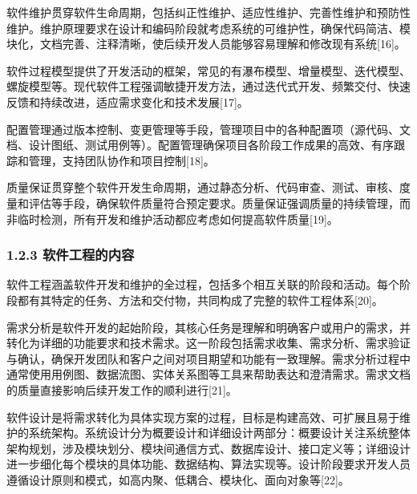 软件维护贯穿软件生命周期，包括纠正性维护、适应性维护、完善性维护和预防性维护。维护原理要求在设计和编码阶段就考虑系统的可维护性，确保代码简洁、模块化，文档完善、注释清晰，使后续开发人员能够容易理解和修改现有系统{[}16{]}。


软件过程模型提供了开发活动的框架，常见的有瀑布模型、增量模型、迭代模型、螺旋模型等。现代软件工程强调敏捷开发方法，通过迭代式开发、频繁交付、快速反馈和持续改进，适应需求变化和技术发展{[}17{]}。


配置管理通过版本控制、变更管理等手段，管理项目中的各种配置项（源代码、文档、设计图纸、测试用例等）。配置管理确保项目各阶段工作成果的高效、有序跟踪和管理，支持团队协作和项目控制{[}18{]}。


质量保证贯穿整个软件开发生命周期，通过静态分析、代码审查、测试、审核、度量和评估等手段，确保软件质量符合预定要求。质量保证强调质量的持续管理，而非临时检测，所有开发和维护活动都应考虑如何提高软件质量{[}19{]}。

\hypertarget{ux8f6fux4ef6ux5de5ux7a0bux7684ux5185ux5bb9}{%
\subsubsection{1.2.3 软件工程的内容}\label{ux8f6fux4ef6ux5de5ux7a0bux7684ux5185ux5bb9}}

软件工程涵盖软件开发和维护的全过程，包括多个相互关联的阶段和活动。每个阶段都有其特定的任务、方法和交付物，共同构成了完整的软件工程体系{[}20{]}。


需求分析是软件开发的起始阶段，其核心任务是理解和明确客户或用户的需求，并转化为详细的功能要求和技术需求。这一阶段包括需求收集、需求分析、需求验证与确认，确保开发团队和客户之间对项目期望和功能有一致理解。需求分析过程中通常使用用例图、数据流图、实体关系图等工具来帮助表达和澄清需求。需求文档的质量直接影响后续开发工作的顺利进行{[}21{]}。


软件设计是将需求转化为具体实现方案的过程，目标是构建高效、可扩展且易于维护的系统架构。系统设计分为概要设计和详细设计两部分：概要设计关注系统整体架构规划，涉及模块划分、模块间通信方式、数据库设计、接口定义等；详细设计进一步细化每个模块的具体功能、数据结构、算法实现等。设计阶段要求开发人员遵循设计原则和模式，如高内聚、低耦合、模块化、面向对象等{[}22{]}。

